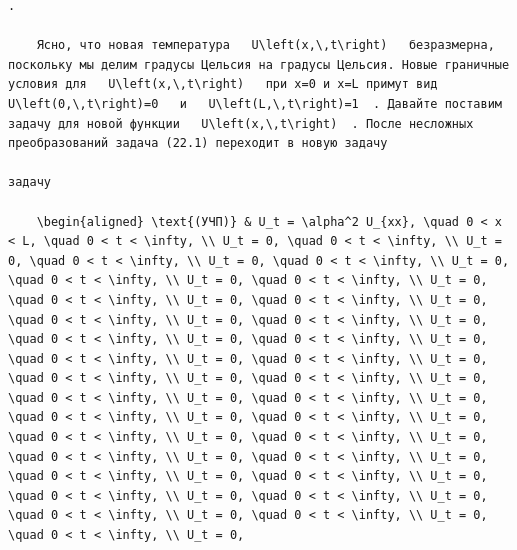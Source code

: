 \documentclass[
  ukrainian,
]{article}
\begin{document}
\begin{verbatim}
.

    Ясно, что новая температура   U\left(x,\,t\right)   безразмерна, поскольку мы делим градусы Цельсия на градусы Цельсия. Новые граничные условия для   U\left(x,\,t\right)   при x=0 и x=L примут вид   U\left(0,\,t\right)=0   и   U\left(L,\,t\right)=1  . Давайте поставим задачу для новой функции   U\left(x,\,t\right)  . После несложных преобразований задача (22.1) переходит в новую задачу

задачу

    \begin{aligned} \text{(УЧП)} & U_t = \alpha^2 U_{xx}, \quad 0 < x < L, \quad 0 < t < \infty, \\ U_t = 0, \quad 0 < t < \infty, \\ U_t = 0, \quad 0 < t < \infty, \\ U_t = 0, \quad 0 < t < \infty, \\ U_t = 0, \quad 0 < t < \infty, \\ U_t = 0, \quad 0 < t < \infty, \\ U_t = 0, \quad 0 < t < \infty, \\ U_t = 0, \quad 0 < t < \infty, \\ U_t = 0, \quad 0 < t < \infty, \\ U_t = 0, \quad 0 < t < \infty, \\ U_t = 0, \quad 0 < t < \infty, \\ U_t = 0, \quad 0 < t < \infty, \\ U_t = 0, \quad 0 < t < \infty, \\ U_t = 0, \quad 0 < t < \infty, \\ U_t = 0, \quad 0 < t < \infty, \\ U_t = 0, \quad 0 < t < \infty, \\ U_t = 0, \quad 0 < t < \infty, \\ U_t = 0, \quad 0 < t < \infty, \\ U_t = 0, \quad 0 < t < \infty, \\ U_t = 0, \quad 0 < t < \infty, \\ U_t = 0, \quad 0 < t < \infty, \\ U_t = 0, \quad 0 < t < \infty, \\ U_t = 0, \quad 0 < t < \infty, \\ U_t = 0, \quad 0 < t < \infty, \\ U_t = 0, \quad 0 < t < \infty, \\ U_t = 0, \quad 0 < t < \infty, \\ U_t = 0, \quad 0 < t < \infty, \\ U_t = 0, \quad 0 < t < \infty, \\ U_t = 0, \quad 0 < t < \infty, \\ U_t = 0, \quad 0 < t < \infty, \\ U_t = 0, \quad 0 < t < \infty, \\ U_t = 0, 
\end{verbatim}
\end{document}

